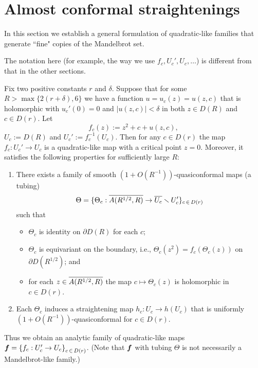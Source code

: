 \section{Almost conformal straightenings}
In this section we establish a general formulation
of quadratic-like families 
that generate ``fine" copies of the Mandelbrot set. 

The notation here (for example, the way we use $f_c, U_c', U_c, \ldots$) is different from that in the other sections. 

\begin{lem}
\label{lem_almost_conformal}
Fix two positive constants $r$ and $\delta$.
Suppose that for some 
$R>\max\{2(r+\delta), 6\}$ we have a function $u=u_c(z)=u(z,c)$ 
that is holomorphic with $u_c'(0)=0$ and $|u(z,c)|<\delta$
in both $z \in D(R)$ and $c \in D(r)$.
Let 
$$
f_c(z):=z^2 + c+u(z,c), 
$$
$U_c:=D(R)$ and $U_c':=f_c^{-1}(U_c)$.
Then for any $c \in D(r)$
the map
$f_c:U_c' \to U_c$ is a quadratic-like map
 with a critical point $z=0$.
Moreover, it satisfies the following properties 
for sufficiently large $R$:
\begin{enumerate}[\rm (1)]
\item
There exists a family of smooth $(1+O(R^{-1}))$-quasiconformal maps (a tubing) 
$$
\Theta=\{\Theta_c: \Bar{A(R^{1/2},R)} \to \Bar{U_{c}} \sminus {U_{c}'} \}_{c\,\in\, D(r)}
$$
such that 
\begin{itemize}
\item $\Theta_c$ is identity on $\partial D(R)$ for each $c$; 
\item
$\Theta_c$ is equivariant on the boundary, i.e., 
$\Theta_c(z^2)=f_c(\Theta_c(z))$ on $\partial D(R^{1/2})$; and 
\item
for each $z \in \Bar{A(R^{1/2},R)}$
 the map $c \mapsto \Theta_c(z)$ is holomorphic in $c \in D(r)$. 
\end{itemize}
\item
Each $\Theta_c$ induces a straightening map $h_c:U_c \to h(U_c)$
that is uniformly $(1+O(R^{-1}))$-quasiconformal for $c \in D(r)$.
\end{enumerate}
\end{lem}

Thus we obtain an analytic family of quadratic-like maps
 $\bs{f}=\skakko{f_c:U_c' \to U_c}_{c \,\in \,D(r)}$.
(Note that $\bs{f}$ with tubing $\Theta$ 
is not necessarily a Mandelbrot-like family.) 


